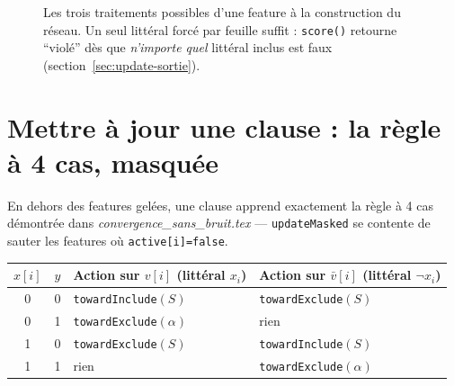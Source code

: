 \documentclass[12pt,a4paper]{article}
\newcommand{\Inc}{\ensuremath{\mathrm{Include}}}
\newcommand{\Exc}{\ensuremath{\mathrm{Exclude}}}
\newcommand{\vbar}{\bar{v}}
\newcommand{\code}[1]{\texttt{#1}}
\theoremstyle{remark}
\begin{document}
\begin{figure}[h]
\centering
{}
\caption{Les trois traitements possibles d'une feature à la construction du
réseau. Un seul littéral forcé par feuille suffit : \code{score()} retourne
``violé'' dès que \emph{n'importe quel} littéral inclus est faux
(section~\ref{sec:update-sortie}).}
\label{fig:freeze}
\end{figure}

\section{Mettre à jour une clause : la règle à 4 cas, masquée}\label{sec:update}

En dehors des features gelées, une clause apprend exactement la règle à 4 cas
démontrée dans \emph{convergence\_sans\_bruit.tex} --- \code{updateMasked} se
contente de sauter les features où \code{active[i]=false}.

\begin{center}
\renewcommand{\arraystretch}{1.4}
\begin{tabular}{ccll}
\toprule
$x[i]$ & $y$ & Action sur $v[i]$ (littéral $x_i$) & Action sur $\vbar[i]$ (littéral $\neg x_i$) \\
\midrule
0 & 0 & \code{towardInclude}$(S)$   & \code{towardExclude}$(S)$ \\
0 & 1 & \code{towardExclude}$(\alpha)$ & rien \\
1 & 0 & \code{towardExclude}$(S)$   & \code{towardInclude}$(S)$ \\
1 & 1 & rien                      & \code{towardExclude}$(\alpha)$ \\
\bottomrule
\end{tabular}
\end{center}
\end{document}
